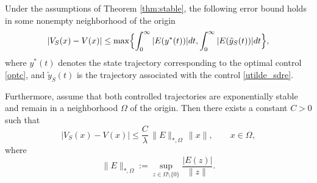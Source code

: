 \documentclass[10pt,a4paper]{amsart}
\begin{document}
\begin{proposition}
Under the assumptions of Theorem \ref{thm:stable}, the following error bound holds in some nonempty neighborhood of the origin
    \begin{equation}
|V_S(x) - V(x)| \leq \max\Bigl\{\int_0^{\infty} |E(y^*(t))| dt, \int_0^{\infty} |E(\tilde{y}_{S}(t))| dt\Bigr\}, 
\label{eq:bound}
\end{equation}
where $y^*(t)$ denotes the state trajectory corresponding to the optimal control \eqref{optc}, and $\tilde{y}_{S}(t)$  is the trajectory associated with the control \eqref{utilde_sdre}.

Furthermore, assume that both controlled trajectories are exponentially stable and remain in a neighborhood $\Omega$ of the origin. Then there exists a constant $C>0$ such that
\begin{equation}
|V_S(x)-V(x)|
\le
\frac{C}{\lambda}\,\|E\|_{*,\Omega}\,\|x\|,
\qquad x\in\Omega,
\label{eq:error_weighted}
\end{equation}
where
\[
\|E\|_{*,\Omega}:=\sup_{z\in\Omega\setminus\{0\}} \frac{|E(z)|}{\|z\|}.
\]



\end{proposition}
\end{document}
